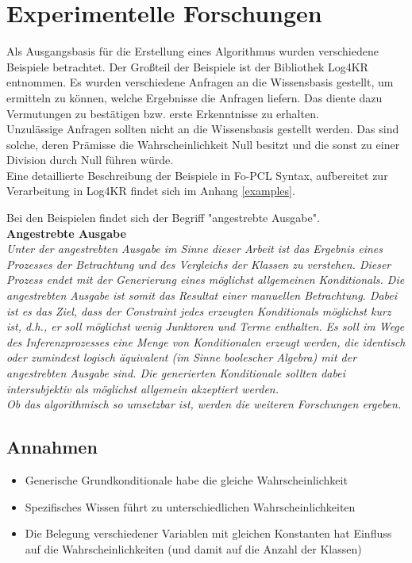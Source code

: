 \documentclass[a4paper, 11pt]{book}
\begin{document}
	
\chapter{Experimentelle Forschungen} \label{Experim. Forschungen}
Als Ausgangsbasis für die Erstellung eines Algorithmus wurden verschiedene Beispiele betrachtet. Der Großteil der Beispiele ist der Bibliothek Log4KR entnommen. Es wurden verschiedene Anfragen an die Wissensbasis gestellt, um ermitteln zu können, welche Ergebnisse die Anfragen liefern. Das diente dazu Vermutungen zu bestätigen bzw. erste Erkenntnisse zu erhalten.\\
Unzulässige Anfragen sollten nicht an die Wissensbasis gestellt werden. Das sind solche, deren Prämisse die Wahrscheinlichkeit Null besitzt und die sonst zu einer Division durch Null führen würde.\\
Eine detaillierte Beschreibung der Beispiele in Fo-PCL Syntax, aufbereitet zur Verarbeitung in Log4KR findet sich im Anhang \ref{examples}.


Bei den Beispielen findet sich der Begriff "{}angestrebte Ausgabe"{}.\\
\textbf{Angestrebte Ausgabe}\\
\label{angestrebte Ausgabe}
\emph{Unter der angestrebten Ausgabe im Sinne dieser Arbeit ist das Ergebnis eines Prozesses der Betrachtung und des Vergleichs der Klassen zu verstehen. Dieser Prozess endet mit der Generierung eines möglichst allgemeinen Konditionals. Die angestrebten Ausgabe ist somit das Resultat einer manuellen Betrachtung. Dabei ist es das Ziel, dass der Constraint jedes erzeugten Konditionals möglichst kurz ist, d.h., er soll möglichst wenig Junktoren und Terme enthalten. Es soll im Wege des Inferenzprozesses eine Menge von Konditionalen erzeugt werden, die identisch oder zumindest logisch äquivalent (im Sinne boolescher Algebra) mit der angestrebten Ausgabe sind.  Die generierten Konditionale sollten dabei intersubjektiv als möglichst allgemein akzeptiert werden.\\
Ob das algorithmisch so umsetzbar ist, werden die weiteren Forschungen ergeben.}

\section{Annahmen}

\begin{itemize}
	\item Generische Grundkonditionale habe die gleiche Wahrscheinlichkeit
	\item Spezifisches Wissen führt zu unterschiedlichen Wahrscheinlichkeiten
	\item Die Belegung verschiedener Variablen mit gleichen Konstanten hat Einfluss auf die Wahrscheinlichkeiten (und damit auf die Anzahl der Klassen)
	
\end{itemize}
\end{document}
